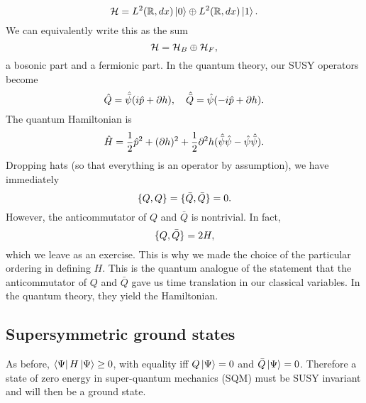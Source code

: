 \begin{equation}
    \mathcal H = L^2(\mathbb{R},dx)\left| 0 \right> \oplus L^2(\mathbb{R}, dx)\left| 1 \right>.
\end{equation}
We can equivalently write this as the sum 
\begin{equation*}
    \mathcal H = \mathcal H_B \oplus \mathcal H_F,
\end{equation*}
a bosonic part and a fermionic part. In the quantum theory, our SUSY operators become
\begin{equation}
    \hat Q = \hat{\bar \psi}(i\hat p + \partial h), \quad \hat{\bar Q}=\hat \psi (-i \hat p + \partial h).
\end{equation}
The quantum Hamiltonian is
\begin{equation}
    \hat H =\frac{1}{2} \hat p^2 +(\partial h)^2 +\frac{1}{2}\partial^2 h(\hat{\bar \psi}\hat \psi - \hat \psi \hat{\bar \psi}).
\end{equation}
Dropping hats (so that everything is an operator by assumption), we have immediately
\begin{equation}
    \{Q,Q\}=\{\bar Q,\bar Q\}=0.
\end{equation}
However, the anticommutator of $Q$ and $\bar Q$ is nontrivial. In fact,
\begin{equation}
    \{Q,\bar Q\}=2H,
\end{equation}
which we leave as an exercise. This is why we made the choice of the particular ordering in defining $H$. This is the quantum analogue of the statement that the anticommutator of $Q$ and $\bar Q$ gave us time translation in our classical variables. In the quantum theory, they yield the Hamiltonian.

\subsection*{Supersymmetric ground states} 
As before, $\left< \Psi \right|H \left| \Psi \right>\geq 0$, with equality iff $Q\left| \Psi \right>=0$ and $\bar Q \left| \Psi \right>=0$. Therefore a state of zero energy in super-quantum mechanics (SQM) must be SUSY invariant and will then be a ground state.

